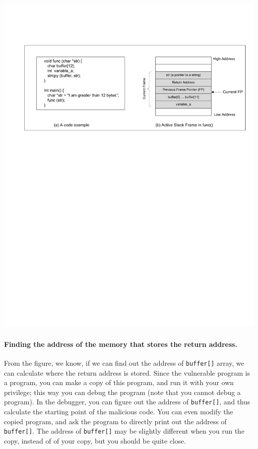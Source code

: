 \hspace{-0.5in}
\includegraphics*[viewport=40 480 595 700,width=6.5in,natwidth=621,natheight=403]{Figs/buffer_overflow_stack_example1.pdf}


\paragraph{Finding the address of the memory that stores the return address.}
From the figure, we know, if we can find out the address of {\tt buffer[]} array, 
we can calculate where the return address is stored. 
Since the vulnerable program is a \setuid program, you can make a copy of this program,
and run it with your own privilege; this way you can debug the program (note that
you cannot debug a \setuid program). In the debugger, you can figure out
the address of {\tt buffer[]}, and thus calculate the starting point of
the malicious code. You can even modify the copied program, and ask the 
program to directly print out the address of {\tt buffer[]}.
The address of {\tt buffer[]} may be slightly
different when you run the \setuid copy, instead of of your copy, but
you should be quite close. 



